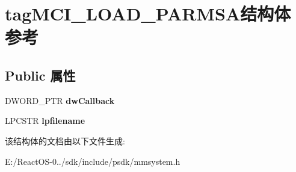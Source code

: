 \hypertarget{structtag_m_c_i___l_o_a_d___p_a_r_m_s_a}{}\section{tag\+M\+C\+I\+\_\+\+L\+O\+A\+D\+\_\+\+P\+A\+R\+M\+S\+A结构体 参考}
\label{structtag_m_c_i___l_o_a_d___p_a_r_m_s_a}
\subsection*{Public 属性}
\begin{DoxyCompactItemize}
\item 
\mbox{\label{structtag_m_c_i___l_o_a_d___p_a_r_m_s_a_a944f6ca910dbaa0e4746e9afe25d89e6}} 
D\+W\+O\+R\+D\+\_\+\+P\+TR {\bfseries dw\+Callback}
\item 
\mbox{\label{structtag_m_c_i___l_o_a_d___p_a_r_m_s_a_abb898a9bfe143cc036ae127956a0d7ea}} 
L\+P\+C\+S\+TR {\bfseries lpfilename}
\end{DoxyCompactItemize}


该结构体的文档由以下文件生成\+:\begin{DoxyCompactItemize}
\item 
E\+:/\+React\+O\+S-\/0../sdk/include/psdk/mmsystem.\+h\end{DoxyCompactItemize}

